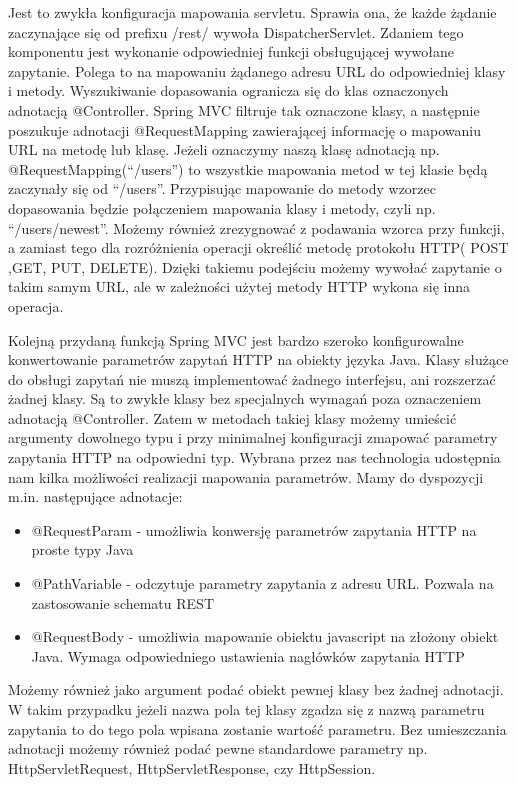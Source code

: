 Jest to zwykła konfiguracja mapowania servletu. Sprawia ona, że każde żądanie zaczynające się od prefixu /rest/ wywoła DispatcherServlet. Zdaniem tego komponentu jest wykonanie odpowiedniej funkcji obsługującej wywołane zapytanie. Polega to na mapowaniu żądanego adresu URL do odpowiedniej klasy i metody. Wyszukiwanie dopasowania ogranicza się do klas oznaczonych adnotacją @Controller. Spring MVC filtruje tak oznaczone klasy, a następnie poszukuje adnotacji @RequestMapping zawierającej informację o mapowaniu URL na metodę lub klasę. Jeżeli oznaczymy naszą klasę adnotacją np. @RequestMapping(“/users”) to wszystkie mapowania metod w tej klasie będą zaczynały się od “/users”. Przypisując mapowanie do metody wzorzec dopasowania będzie połączeniem mapowania klasy i metody, czyli np. “/users/newest”. Możemy również zrezygnować z podawania wzorca przy funkcji, a zamiast tego dla rozróżnienia operacji określić metodę protokołu HTTP( POST ,GET, PUT, DELETE). Dzięki takiemu podejściu możemy wywołać zapytanie o takim samym URL, ale w zależności użytej metody HTTP wykona się inna operacja. 

Kolejną przydaną funkcją Spring MVC jest bardzo szeroko konfigurowalne konwertowanie parametrów zapytań HTTP na obiekty języka Java. Klasy służące do obsługi zapytań nie muszą implementować żadnego interfejsu, ani rozszerzać żadnej klasy. Są to zwykłe klasy bez specjalnych wymagań poza oznaczeniem adnotacją @Controller. Zatem w metodach takiej klasy możemy umieścić argumenty dowolnego typu i przy minimalnej konfiguracji zmapować parametry zapytania HTTP na odpowiedni typ. Wybrana przez nas technologia udostępnia nam kilka możliwości realizacji mapowania parametrów. Mamy do dyspozycji m.in. następujące adnotacje:

\begin{itemize}
\item @RequestParam - umożliwia konwersję parametrów zapytania HTTP na proste typy Java
\item @PathVariable - odczytuje parametry zapytania z adresu URL. Pozwala na zastosowanie schematu REST 
\item @RequestBody - umożliwia mapowanie obiektu javascript na złożony obiekt Java. Wymaga odpowiedniego ustawienia nagłówków zapytania HTTP
\end{itemize}

Możemy również jako argument podać obiekt pewnej klasy bez żadnej adnotacji. W takim przypadku jeżeli nazwa pola tej klasy zgadza się z nazwą parametru zapytania to do tego pola wpisana zostanie wartość parametru. Bez umieszczania adnotacji możemy również podać pewne standardowe parametry np. HttpServletRequest, HttpServletResponse, czy HttpSession.

